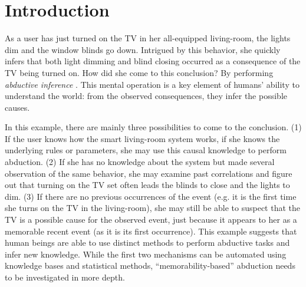 \documentclass[entropy,article,submit,moreauthors,pdftex]{Definitions/mdpi}
\begin{document}

\section{Introduction}


As a user has just turned on the TV in her all-equipped living-room, the
lights dim and the window blinds go down. Intrigued by this behavior, she
quickly infers that both light dimming and blind closing occurred as a
consequence of the TV being turned on. How did she come to this conclusion?
By performing \emph{abductive inference} \cite{magnani_abduction_2011}. This mental operation
is a key element of humans' ability to understand the world: from the
observed consequences, they infer the possible causes.

In this example, there are mainly three possibilities to come to the
conclusion. (1) If the user knows how the smart living-room system works, if she
knows the underlying rules or parameters, she may use this causal
knowledge to perform abduction. (2) If she has no knowledge
about the system but made several observation of the same behavior, she may examine past
correlations and figure out that turning on the TV set often leads the blinds to
close and the lights to dim. (3) If there are no previous occurrences of the event (e.g. it is the first time she turns on the TV
in the living-room), she may still be able to
suspect that the TV is a possible cause for the observed event, just because it appears to her as a memorable recent event (as it is its first occurrence). This example
suggests that human beings are able to use distinct methods to perform abductive tasks
and infer new knowledge. While the first two mechanisms can be
automated using knowledge bases and statistical methods, ``memorability-based'' abduction needs to be investigated in more depth.




\end{document}

